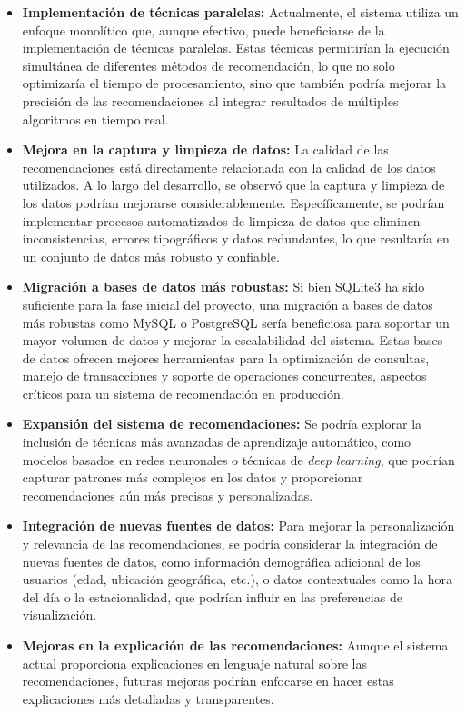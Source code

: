 \documentclass{llncs}
\begin{document}
	\begin{itemize}
		\item \textbf{Implementación de técnicas paralelas:} Actualmente, el sistema utiliza un enfoque monolítico que, aunque efectivo, puede beneficiarse de la implementación de técnicas paralelas. Estas técnicas permitirían la ejecución simultánea de diferentes métodos de recomendación, lo que no solo optimizaría el tiempo de procesamiento, sino que también podría mejorar la precisión de las recomendaciones al integrar resultados de múltiples algoritmos en tiempo real.
		
		\item \textbf{Mejora en la captura y limpieza de datos:} La calidad de las recomendaciones está directamente relacionada con la calidad de los datos utilizados. A lo largo del desarrollo, se observó que la captura y limpieza de los datos podrían mejorarse considerablemente. Específicamente, se podrían implementar procesos automatizados de limpieza de datos que eliminen inconsistencias, errores tipográficos y datos redundantes, lo que resultaría en un conjunto de datos más robusto y confiable.
		
		\item \textbf{Migración a bases de datos más robustas:} Si bien SQLite3 ha sido suficiente para la fase inicial del proyecto, una migración a bases de datos más robustas como MySQL o PostgreSQL sería beneficiosa para soportar un mayor volumen de datos y mejorar la escalabilidad del sistema. Estas bases de datos ofrecen mejores herramientas para la optimización de consultas, manejo de transacciones y soporte de operaciones concurrentes, aspectos críticos para un sistema de recomendación en producción.
		
		\item \textbf{Expansión del sistema de recomendaciones:} Se podría explorar la inclusión de técnicas más avanzadas de aprendizaje automático, como modelos basados en redes neuronales o técnicas de \textit{deep learning}, que podrían capturar patrones más complejos en los datos y proporcionar recomendaciones aún más precisas y personalizadas.
		
		\item \textbf{Integración de nuevas fuentes de datos:} Para mejorar la personalización y relevancia de las recomendaciones, se podría considerar la integración de nuevas fuentes de datos, como información demográfica adicional de los usuarios (edad, ubicación geográfica, etc.), o datos contextuales como la hora del día o la estacionalidad, que podrían influir en las preferencias de visualización.
		
		\item \textbf{Mejoras en la explicación de las recomendaciones:} Aunque el sistema actual proporciona explicaciones en lenguaje natural sobre las recomendaciones, futuras mejoras podrían enfocarse en hacer estas explicaciones más detalladas y transparentes.
		
	\end{itemize}
	
\end{document}
